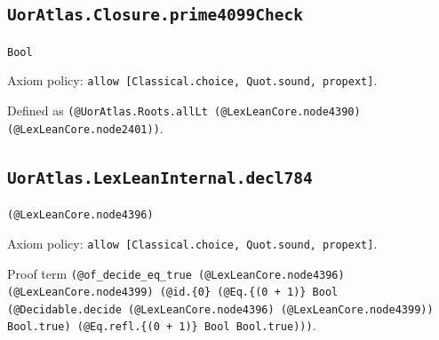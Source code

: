 \documentclass[11pt]{article}
\begin{document}
\subsection*{\texttt{UorAtlas.Closure.prime4099Check}}
\noindent\texttt{Bool}\par
\noindent Axiom policy: \texttt{allow [Classical.choice, Quot.sound, propext]}.\par
\noindent Defined as \texttt{(@UorAtlas.Roots.allLt (@LexLeanCore.node4390) (@LexLeanCore.node2401))}.\par
\subsection*{\texttt{UorAtlas.LexLeanInternal.decl784}}
\noindent\texttt{(@LexLeanCore.node4396)}\par
\noindent Axiom policy: \texttt{allow [Classical.choice, Quot.sound, propext]}.\par
\noindent Proof term \texttt{(@of\_decide\_eq\_true (@LexLeanCore.node4396) (@LexLeanCore.node4399) (@id.\{0\} (@Eq.\{(0 + 1)\} Bool (@Decidable.decide (@LexLeanCore.node4396) (@LexLeanCore.node4399)) Bool.true) (@Eq.refl.\{(0 + 1)\} Bool Bool.true)))}.\par
\end{document}
